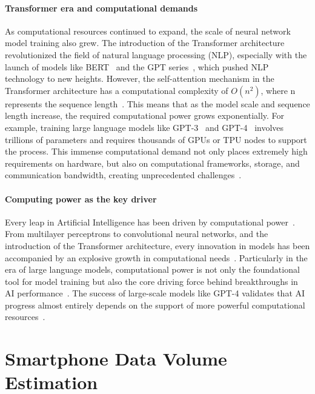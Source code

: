 \paragraph{Transformer era and computational demands}
As computational resources continued to expand, the scale of neural network model training also grew. The introduction of the Transformer architecture~\cite{vaswani2017attention} revolutionized the field of natural language processing (NLP), especially with the launch of models like BERT~\cite{devlin2018bert} and the GPT series~\cite{brown2020language,openai2023gpt4}, which pushed NLP technology to new heights. However, the self-attention mechanism in the Transformer architecture has a computational complexity of $O(n^2)$, where n represents the sequence length~\cite{vaswani2017attention}. This means that as the model scale and sequence length increase, the required computational power grows exponentially. For example, training large language models like GPT-3~\cite{brown2020language} and GPT-4~\cite{openai2023gpt4} involves trillions of parameters and requires thousands of GPUs or TPU nodes to support the process. This immense computational demand not only places extremely high requirements on hardware, but also on computational frameworks, storage, and communication bandwidth, creating unprecedented challenges~\cite{patterson2021carbon}.

\paragraph{Computing power as the key driver}
Every leap in Artificial Intelligence has been driven by computational power~\cite{amodei2018ai}. From multilayer perceptrons to convolutional neural networks, and the introduction of the Transformer architecture, every innovation in models has been accompanied by an explosive growth in computational needs~\cite{thompson2020computational}. Particularly in the era of large language models, computational power is not only the foundational tool for model training but also the core driving force behind breakthroughs in AI performance~\cite{kaplan2020scaling}. The success of large-scale models like GPT-4 validates that AI progress almost entirely depends on the support of more powerful computational resources~\cite{hoffmann2022training}.



\section{Smartphone Data Volume Estimation}  
\label{app:smartphone_ethod}

